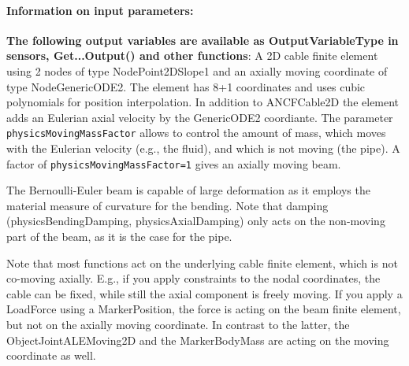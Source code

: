 \paragraph{Information on input parameters:} 
\finishTable
{\bf The following output variables are available as OutputVariableType in sensors, Get...Output() and other functions}: 
\finishTable
 \noindent
    A 2D cable finite element using 2 nodes of type NodePoint2DSlope1 and an axially moving coordinate of type NodeGenericODE2.
    The element has 8+1 coordinates and uses cubic polynomials for position interpolation.
    In addition to ANCFCable2D the element adds an Eulerian axial velocity by the GenericODE2 coordiante.
    The parameter \texttt{physicsMovingMassFactor} allows to control the amount of mass, which moves with
    the Eulerian velocity (e.g., the fluid), and which is not moving (the pipe). 
    A factor of \texttt{physicsMovingMassFactor=1} gives an axially moving beam.

    The Bernoulli-Euler beam is capable of large deformation as it employs the material measure of curvature for the bending.
    Note that damping (physicsBendingDamping, physicsAxialDamping) only acts on the non-moving part of the beam, as it is the case for the pipe.
    
    Note that most functions act on the underlying cable finite element, which is not co-moving axially. E.g., if you apply constraints
    to the nodal coordinates, the cable can be fixed, while still the axial component is freely moving.
    If you apply a LoadForce using a MarkerPosition, the force is acting on the beam finite element, but not on the axially moving coordinate.
    In contrast to the latter, the ObjectJointALEMoving2D and the MarkerBodyMass are acting on the moving coordinate as well.

